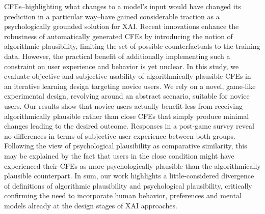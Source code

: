 \Glspl{CFE}--highlighting what changes to a model's input would have changed its prediction in a particular way--have gained considerable traction as a psychologically grounded solution for \gls{XAI}. 
Recent innovations enhance the robustness of automatically generated \glspl{CFE} by introducing the notion of algorithmic plausibility, limiting the set of possible counterfactuals to the training data.
However, the practical benefit of additionally implementing such a constraint on user experience and behavior is yet unclear.
In this study, we evaluate objective and subjective usability of algorithmically plausible \glspl{CFE} in an iterative learning design targeting novice users.
We rely on a novel, game-like experimental design, revolving around an abstract scenario, suitable for novice users.
Our results show that novice users actually benefit less from receiving algorithmically plausible rather than close \glspl{CFE} that simply produce minimal changes leading to the desired outcome.
Responses in a post-game survey reveal no differences in terms of subjective user experience between both groups.
Following the view of psychological plausibility as comparative similarity, this may be explained by the fact that users in the close condition might have experienced their \glspl{CFE} as more psychologically plausible than the algorithmically plausible counterpart.
In sum, our work highlights a little-considered divergence of definitions of algorithmic plausibility and psychological plausibility, critically confirming the need to incorporate human behavior, preferences and mental models already at the design stages of \gls{XAI} approaches.
